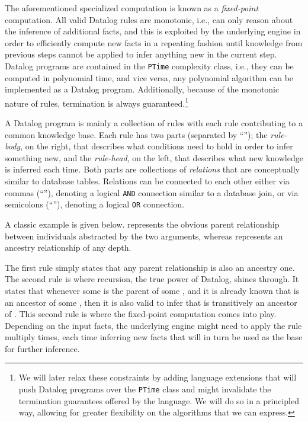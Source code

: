 The aforementioned specialized computation is known as a \emph{fixed-point}
computation. All valid Datalog rules are monotonic, i.e., can only reason about
the inference of additional facts, and this is exploited by the underlying
engine in order to efficiently compute new facts in a repeating fashion until
knowledge from previous steps cannot be applied to infer anything new in the
current step. Datalog programs are contained in the \texttt{PTime} complexity
class, i.e., they can be computed in polynomial time, and vice versa, any
polynomial algorithm can be implemented as a Datalog program. Additionally,
because of the monotonic nature of rules, termination is always
guaranteed.\footnote{We will later relax these constraints by adding language
extensions that will push Datalog programs over the \texttt{PTime} class and
might invalidate the termination guarantees offered by the language. We will do
so in a principled way, allowing for greater flexibility on the algorithms that
we can express.}

A Datalog program is mainly a collection of rules with each rule contributing
to a common knowledge base. Each rule has two parts (separated by ``\dl{:-}'');
the \emph{rule-body}, on the right, that describes what conditions need to hold
in order to infer something new, and the \emph{rule-head}, on the left, that
describes what new knowledge is inferred each time. Both parts are collections
of \emph{relations} that are conceptually similar to database tables. Relations
can be connected to each other either via commas (``\dl{,}''), denoting a
logical \texttt{AND} connection similar to a database join, or via semicolons
(``\dl{;}''), denoting a logical \texttt{OR} connection.

A classic example is given below.  represents the obvious
parent relationship between individuals abstracted by the two arguments,
whereas  represents an ancestry relationship of any depth. 

 \dl{:-} 

 \dl{:-} \dl{,} 

The first rule simply states that any parent relationship is also an ancestry
one. The second rule is where recursion, the true power of Datalog, shines
through. It states that whenever some  is the parent of some ,
and it is already known that  is an ancestor of some , then it
is also valid to infer that  is transitively an ancestor of .
This second rule is where the fixed-point computation comes into play.
Depending on the input facts, the underlying engine might need to apply the
rule multiply times, each time inferring new facts that will in turn be used as
the base for further inference.


